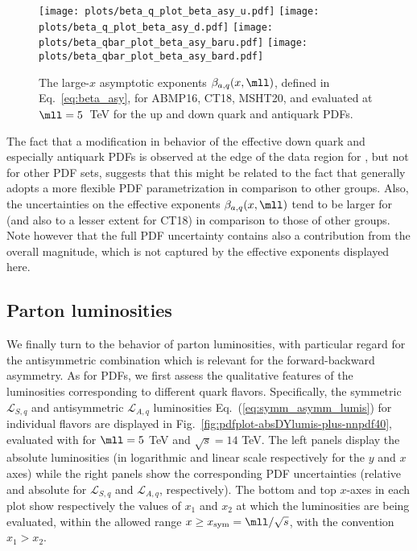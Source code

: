\begin{figure}[!t]
 \centering
 \texttt{[image: plots/beta\_q\_plot\_beta\_asy\_u.pdf]}
 \texttt{[image: plots/beta\_q\_plot\_beta\_asy\_d.pdf]}
 \texttt{[image: plots/beta\_qbar\_plot\_beta\_asy\_baru.pdf]}
 \texttt{[image: plots/beta\_qbar\_plot\_beta\_asy\_bard.pdf]}
 \caption{\small The large-$x$ asymptotic exponents $\beta_{a,q}(x,\mll)$, defined
   in Eq.~\eqref{eq:beta_asy},
   for ABMP16, CT18, MSHT20, and  evaluated at $\mll=5$~TeV
   for the up and down quark and antiquark PDFs.}    
 \label{fig:asy_exponents}
\end{figure}

The fact that a modification in behavior of the effective down quark
and especially antiquark PDFs is observed at the edge of the data
region for , but not for other PDF sets, suggests that this
might be related to the fact that   generally adopts a more
flexible PDF parametrization in comparison to other groups.
%
Also, the  uncertainties on the effective exponents
$\beta_{a,q}(x,\mll)$ tend to be larger for  (and also to a
lesser extent for CT18) in comparison to those of other groups.
Note however that the full PDF uncertainty contains also a
contribution from the overall 
magnitude, which is not captured by the effective exponents displayed here.

\subsection{Parton luminosities}
\label{subsec:partoniclumis}

We finally turn to the behavior of parton luminosities, with
particular regard for the antisymmetric combination which is relevant
for the forward-backward asymmetry.
As for PDFs, we first assess the qualitative features of the
luminosities corresponding to different quark flavors.
Specifically, the symmetric $\mathcal{L}_{S,q}$ and antisymmetric
$\mathcal{L}_{A,q}$ luminosities
Eq.~(\ref{eq:symm_asymm_lumis})  for individual flavors are
displayed in Fig.~\ref{fig:pdfplot-absDYlumis-plus-nnpdf40},
evaluated with  \nnlo for $\mll=5$ TeV and $\sqrt{s}=14$ TeV.
%
The left panels display the absolute luminosities (in logarithmic and
linear scale respectively
for the $y$ and $x$ axes)
while the right panels show the corresponding PDF uncertainties (relative and absolute for
$\mathcal{L}_{S,q}$ and $\mathcal{L}_{A,q}$, respectively).
%
The bottom  and top $x$-axes in each plot show respectively the values
of $x_1$ and $x_2$  at which the
luminosities are being evaluated, within the allowed range
$x \ge x_{\rm sym}=\mll/\sqrt{s}$, with the convention $x_1>x_2$.

